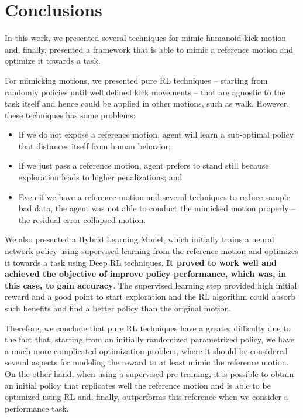 \section{Conclusions}
In this work, we presented several techniques for mimic humanoid kick motion and, finally, presented a framework that is able to mimic a reference motion and optimize it towards a task.

For mimicking motions, we presented pure RL techniques -- starting from randomly policies until well defined kick movements -- that are agnostic to the task itself and hence could be applied in other motions, such as walk. However, these techniques has some problems:

\begin{itemize}
	\item If we do not expose a reference motion, agent will learn a sub-optimal policy that distances itself from human behavior;
	\item If we just pass a reference motion, agent prefers to stand still because exploration leads to higher penalizations; and
	\item Even if we have a reference motion and several techniques to reduce sample bad data, the agent was not able to conduct the mimicked motion properly -- the residual error collapsed motion.
\end{itemize}



We also presented a Hybrid Learning Model, which initially trains a neural network policy using supervised learning from the reference motion and optimizes it towards a task using Deep RL techniques. \textbf{It proved to work well and achieved the objective of improve policy performance, which was, in this case, to gain accuracy}. The supervised learning step provided high initial reward and a good point to start exploration and the RL algorithm could absorb such benefits and find a better policy than the original motion.

Therefore, we conclude that pure RL techniques have a greater difficulty due to the fact that, starting from an initially randomized parametrized policy, we have a much more complicated optimization problem, where it should be considered
several aspects for modeling the reward to at least mimic the reference motion. On the other hand, when using a supervised pre training, it is possible to obtain an initial policy that replicates well the reference motion and is able to be optimized using RL and, finally, outperforms this reference when we consider a performance task.

